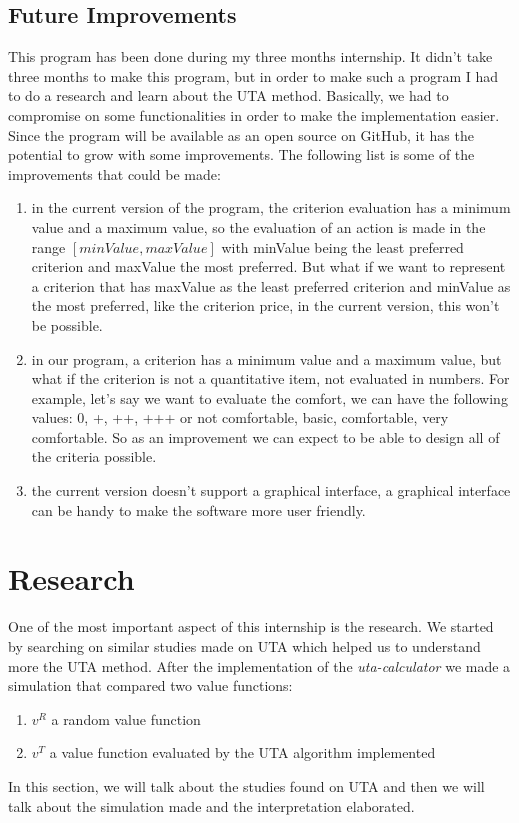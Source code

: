 \documentclass{report}
\begin{document}
\subsection{Future Improvements}
This program has been done during my three months internship. It didn't take three months to make this program, but in order to make such a program I had to do a research and learn about the UTA method. Basically, we had to compromise on some functionalities in order to make the implementation easier. Since the program will be available as an open source on GitHub, it has the potential to grow with some improvements. The following list is some of the improvements that could be made:\\
\begin{enumerate}
\item in the current version of the program, the criterion evaluation has a minimum value and a maximum value, so the evaluation of an action is made in the range $[minValue, maxValue]$ with minValue being the least preferred criterion and maxValue the most preferred. But what if we want to represent a criterion that has maxValue as the least preferred criterion and minValue as the most preferred, like the criterion price, in the current version, this won't be possible. 
\item in our program, a criterion has a minimum value and a maximum value, but what if the criterion is not a quantitative item, not evaluated in numbers. For example, let's say we want to evaluate the comfort, we can have the following values: 0, +, ++, +++ or not comfortable, basic, comfortable, very comfortable. So as an improvement we can expect to be able to design all of the criteria possible. 
\item the current version doesn't support a graphical interface, a graphical interface can be handy to make the software more user friendly. \\
\end{enumerate}

\section{Research}
One of the most important aspect of this internship is the research. We started by searching on similar studies made on UTA which helped us to understand more the UTA method. After the implementation of the \textit{uta-calculator} we made a simulation that compared two value functions: 
\begin{enumerate}
\item $v^R$ a random value function
\item $v^T$ a value function evaluated by the UTA algorithm implemented\\
\end{enumerate}
In this section, we will talk about the studies found on UTA and then we will talk about the simulation made and the interpretation elaborated. 
\end{document}
